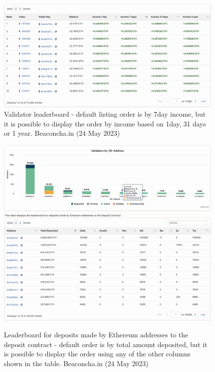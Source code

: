 \documentclass[UTF8]{article}
\begin{document}
{\begin{figure}[htbp]
\begin{center}
\includegraphics[width=0.9\linewidth]{images/bvalleader}
\caption{Validator leaderboard - default listing order is by 7day income, but it is possible to display the order by income based on 1day, 31 days or 1 year. Beaconcha.in (24 May 2023)}
\label{fig:bvalleader}
\end{center}
\end{figure}

\begin{figure}[htbp]
\begin{center}
\includegraphics[width=0.9\linewidth]{images/bdeplead}\\
\includegraphics[width=0.9\linewidth]{images/bdepleadtbl}
\caption{Leaderboard for deposits made by Ethereum addresses to the deposit contract - default order is by total amount deposited, but it is possible to display the order using any of the other columns shown in the table. Beaconcha.in (24 May 2023)}
\label{fig:bdepleadtbl}
\end{center}
\end{figure}

}
\end{document}
